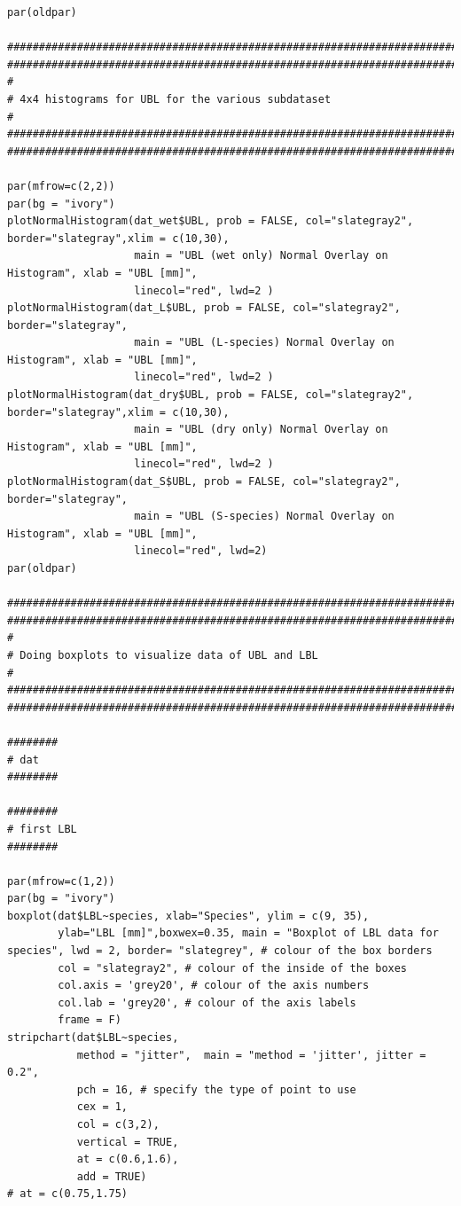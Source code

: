 \documentclass{article}
\begin{document}
\begin{verbatim}
par(oldpar)

##############################################################################
##############################################################################
#
# 4x4 histograms for UBL for the various subdataset
#
##############################################################################
##############################################################################

par(mfrow=c(2,2))
par(bg = "ivory")
plotNormalHistogram(dat_wet$UBL, prob = FALSE, col="slategray2", border="slategray",xlim = c(10,30),
                    main = "UBL (wet only) Normal Overlay on Histogram", xlab = "UBL [mm]",
                    linecol="red", lwd=2 )
plotNormalHistogram(dat_L$UBL, prob = FALSE, col="slategray2", border="slategray",
                    main = "UBL (L-species) Normal Overlay on Histogram", xlab = "UBL [mm]",
                    linecol="red", lwd=2 )
plotNormalHistogram(dat_dry$UBL, prob = FALSE, col="slategray2", border="slategray",xlim = c(10,30),
                    main = "UBL (dry only) Normal Overlay on Histogram", xlab = "UBL [mm]",
                    linecol="red", lwd=2 )
plotNormalHistogram(dat_S$UBL, prob = FALSE, col="slategray2", border="slategray",
                    main = "UBL (S-species) Normal Overlay on Histogram", xlab = "UBL [mm]",
                    linecol="red", lwd=2)
par(oldpar)

##############################################################################
##############################################################################
#
# Doing boxplots to visualize data of UBL and LBL
#
##############################################################################
##############################################################################

########
# dat
########

########
# first LBL
########

par(mfrow=c(1,2))
par(bg = "ivory")
boxplot(dat$LBL~species, xlab="Species", ylim = c(9, 35),
        ylab="LBL [mm]",boxwex=0.35, main = "Boxplot of LBL data for species", lwd = 2, border= "slategrey", # colour of the box borders
        col = "slategray2", # colour of the inside of the boxes
        col.axis = 'grey20', # colour of the axis numbers 
        col.lab = 'grey20', # colour of the axis labels
        frame = F)
stripchart(dat$LBL~species,
           method = "jitter",  main = "method = 'jitter', jitter = 0.2",
           pch = 16, # specify the type of point to use
           cex = 1,
           col = c(3,2),
           vertical = TRUE, 
           at = c(0.6,1.6),
           add = TRUE)
# at = c(0.75,1.75)


\end{verbatim}
\end{document}
